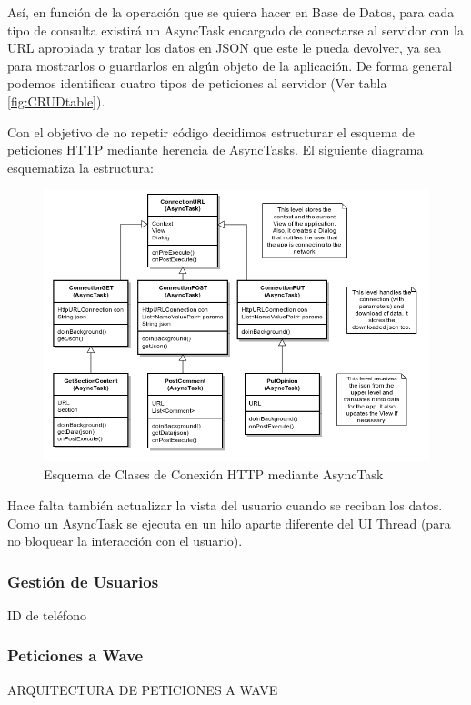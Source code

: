 		Así, en función de la operación que se quiera hacer en Base de Datos, para cada tipo de consulta existirá un AsyncTask encargado de conectarse al servidor con la URL apropiada y tratar los datos en JSON que este le pueda devolver, ya sea para mostrarlos o guardarlos en algún objeto de la aplicación. De forma general podemos identificar cuatro tipos de peticiones al servidor (Ver tabla \ref{fig:CRUDtable}).

Con el objetivo de no repetir código decidimos estructurar el esquema de peticiones HTTP mediante herencia de AsyncTasks. El siguiente diagrama esquematiza la estructura: 

	\begin{figure}[H]
	  \centering
	    \includegraphics[keepaspectratio, scale=0.6]{Media/Diagrams/classDiagramAsyncTask.png}
	  \caption{Esquema de Clases de Conexión HTTP mediante AsyncTask}
	  \label{fig:classConnectionTree}
	\end{figure}	
	
	Hace falta también actualizar la vista del usuario cuando se reciban los datos. Como un AsyncTask se ejecuta en un hilo aparte diferente del UI Thread (para no bloquear la interacción con el usuario).	
		
		
	\subsubsection{Gestión de Usuarios}
	
		ID de teléfono
		
	\subsubsection{Peticiones a Wave}

		ARQUITECTURA DE PETICIONES A WAVE
		
	

